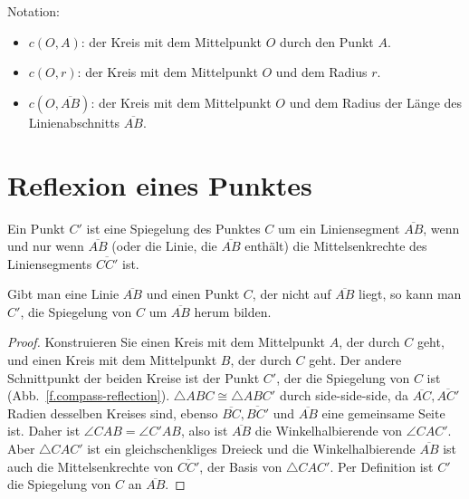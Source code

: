\noindent{}Notation:
\begin{itemize}
\item $c(O,A)$: der Kreis mit dem Mittelpunkt $O$ durch den Punkt $A$.
\item $c(O,r)$: der Kreis mit dem Mittelpunkt $O$ und dem Radius $r$.
\item $c(O,\overline{AB})$: der Kreis mit dem Mittelpunkt $O$ und dem Radius der Länge des Linienabschnitts $\overline{AB}$.
\end{itemize}


\section{Reflexion eines Punktes}\label{s.reflection}

\begin{definition}
Ein Punkt $C'$ ist eine Spiegelung des Punktes $C$ um ein Liniensegment $\overline{AB}$, wenn und nur wenn $\overline{AB}$ (oder die Linie, die $\overline{AB}$ enthält) die Mittelsenkrechte des Liniensegments $\overline{CC'}$ ist.
\end{definition}

\begin{theorem}\label{thm.compass-reflection}
Gibt man eine Linie $\overline{AB}$ und einen Punkt $C$, der nicht auf $\overline{AB}$ liegt, so kann man $C'$, die Spiegelung von $C$ um $\overline{AB}$ herum bilden.
\end{theorem}

\begin{proof} 
Konstruieren Sie einen Kreis mit dem Mittelpunkt $A$, der durch $C$ geht, und einen Kreis mit dem Mittelpunkt $B$, der durch $C$ geht. Der andere Schnittpunkt der beiden Kreise ist der Punkt $C'$, der die Spiegelung von $C$ ist (Abb.~\ref{f.compass-reflection}).
$\triangle ABC \cong \triangle ABC'$ durch side-side-side, da $\overline{AC}, \overline{AC'}$ Radien desselben Kreises sind, ebenso $\overline{BC}, \overline{BC'}$ und $\overline{AB}$ eine gemeinsame Seite ist. Daher ist $\angle CAB = \angle C'AB$, also ist $\overline{AB}$ die Winkelhalbierende von $\angle CAC'$. Aber $\triangle CAC'$ ist ein gleichschenkliges Dreieck und die Winkelhalbierende $\overline{AB}$ ist auch die Mittelsenkrechte von $\overline{CC'}$, der Basis von $\triangle CAC'$. Per Definition ist $C'$ die Spiegelung von $C$ an $\overline{AB}$.
\end{proof}


